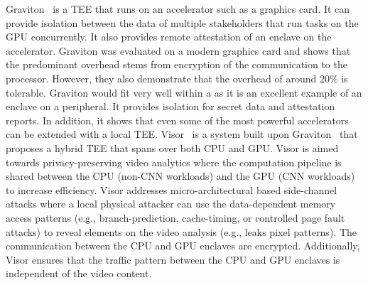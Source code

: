  Graviton~\cite{volos2018graviton} is a TEE that runs on an accelerator such as a graphics card. It can provide isolation between the data of multiple stakeholders that run tasks on the GPU concurrently. It also provides remote attestation of an enclave on the accelerator. Graviton was evaluated on a modern graphics card and shows that the predominant overhead stems from encryption of the communication to the processor. However, they also demonstrate that the overhead of around 20\% is tolerable. Graviton would fit very well within a \name{} as it is an excellent example of an enclave on a peripheral. It provides isolation for secret data and attestation reports. In addition, it shows that even some of the most powerful accelerators can be extended with a local TEE. Visor~\cite{visor} is a system built upon Graviton~\cite{volos2018graviton} that proposes a hybrid TEE that spans over both CPU and GPU. Visor is aimed towards privacy-preserving video analytics where the computation pipeline is shared between the CPU (non-CNN workloads) and the GPU (CNN workloads) to increase efficiency. Visor addresses micro-architectural based side-channel attacks where a local physical attacker can use the data-dependent memory access patterns (e.g., branch-prediction, cache-timing, or controlled page fault attacks) to reveal elements on the video analysis (e.g., leaks pixel patterns). The communication between the CPU and GPU enclaves are encrypted. Additionally, Visor ensures that the traffic pattern between the CPU and GPU enclaves is independent of the video content.


